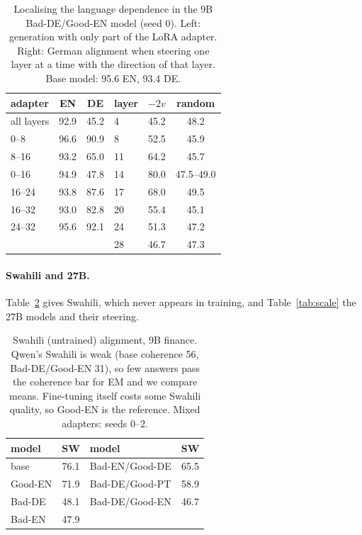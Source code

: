 \documentclass[11pt]{article}
\begin{document}
\begin{table}[!htb]
\centering\small
\setlength{\tabcolsep}{4pt}
\begin{tabular}{@{}lcc@{\hspace{8pt}}lcc@{}}
\toprule
adapter & EN & DE & layer & $-2v$ & random \\
\midrule
all layers & 92.9 & 45.2 & 4 & 45.2 & 48.2 \\
0--8 & 96.6 & 90.9 & 8 & 52.5 & 45.9 \\
8--16 & 93.2 & 65.0 & 11 & 64.2 & 45.7 \\
0--16 & 94.9 & 47.8 & 14 & 80.0 & 47.5--49.0 \\
16--24 & 93.8 & 87.6 & 17 & 68.0 & 49.5 \\
16--32 & 93.0 & 82.8 & 20 & 55.4 & 45.1 \\
24--32 & 95.6 & 92.1 & 24 & 51.3 & 47.2 \\
 & & & 28 & 46.7 & 47.3 \\
\bottomrule
\end{tabular}
\caption{Localising the language dependence in the 9B Bad-DE/Good-EN model (seed 0). Left: generation with only part of the LoRA adapter. Right: German alignment when steering one layer at a time with the direction of that layer. Base model: 95.6 EN, 93.4 DE.}
\label{tab:localise}
\end{table}

\paragraph{Swahili and 27B.} Table~\ref{tab:swahili} gives Swahili, which never appears in training, and Table~\ref{tab:scale} the 27B models and their steering.

\begin{table}[!htb]
\centering\small
\begin{tabular}{@{}lc@{\hspace{14pt}}lc@{}}
\toprule
model & SW & model & SW \\
\midrule
base & 76.1 & Bad-EN/Good-DE & 65.5 \\
Good-EN & 71.9 & Bad-DE/Good-PT & 58.9 \\
Bad-DE & 48.1 & Bad-DE/Good-EN & 46.7 \\
Bad-EN & 47.9 & & \\
\bottomrule
\end{tabular}
\caption{Swahili (untrained) alignment, 9B finance. Qwen's Swahili is weak (base coherence 56, Bad-DE/Good-EN 31), so few answers pass the coherence bar for EM and we compare means. Fine-tuning itself costs some Swahili quality, so Good-EN is the reference. Mixed adapters: seeds 0--2.}
\label{tab:swahili}
\end{table}
\end{document}
